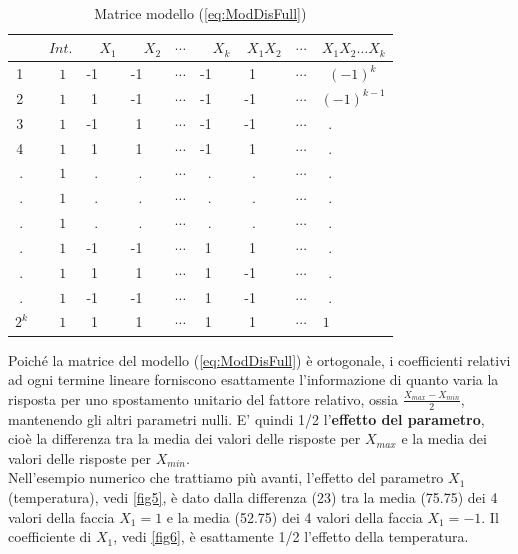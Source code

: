 \documentclass[
]{book}
\begin{document}
\begin{table}[ht]
\caption{Matrice modello (\ref{eq:ModDisFull})}
\

\label{tab:MatrModDisFull}
\centering
\begin{tabular}{rrrrrrrrr}
  \hline
       \vline & $Int.$ & $X_1$ & $X_2$ & $\cdots$ &  $X_k$ & $X_1X_2$ & $\cdots$ & $X_1X_2\dots X_k$ \\
  \hline
  1 \    \vline & $1 \ \ $ & -1 \ \ & -1 \ \ & $\cdots$ & -1 \ \ &  1 \ \ \ & $\cdots$ & $(-1)^k \ \ \ $\\
  2 \    \vline & $1 \ \ $ & 1  \ \ & -1 \ \ & $\cdots$ & -1 \ \ & -1 \ \ \ & $\cdots$ & $(-1)^{k-1}$\\
  3 \    \vline & $1 \ \ $ & -1 \ \ & 1  \ \ & $\cdots$ &-1  \ \ & -1 \ \ \ & $\cdots$ & . \ \ \ \ \ \ \ \\
  4 \    \vline & $1 \ \ $ & 1  \ \ & 1  \ \ & $\cdots$ &-1  \ \ &  1 \ \ \ &  $\cdots$ & . \ \ \ \ \ \ \ \\
  . \    \vline & $1 \ \ $ & .  \ \ & .  \ \ & $\cdots$ & .  \ \ &  . \ \ \ &  $\cdots$ & . \ \ \ \ \ \ \ \\
  . \    \vline & $1 \ \ $ & .  \ \ & .  \ \ & $\cdots$ & .  \ \ &  . \ \ \ &  $\cdots$ & . \ \ \ \ \ \ \ \\
  . \    \vline & $1 \ \ $ & .  \ \ & .  \ \ & $\cdots$ & .  \ \ &  . \ \ \ &  $\cdots$ & . \ \ \ \ \ \ \ \\
  . \    \vline & $1 \ \ $ & -1 \ \ & -1 \ \ & $\cdots$ & 1  \ \ &  1 \ \ \ &  $\cdots$ & . \ \ \ \ \ \ \ \\
  . \    \vline & $1 \ \ $ & 1  \ \ & 1  \ \ & $\cdots$ & 1  \ \ & -1 \ \ \ &  $\cdots$ & . \ \ \ \ \ \ \ \\
  . \    \vline & $1 \ \ $ & -1 \ \ & -1 \ \ & $\cdots$ &  1 \ \ & -1 \ \ \ &  $\cdots$ & . \ \ \ \ \ \ \ \\
 $2^k$\  \vline & $1 \ \ $ & 1  \ \ & 1  \ \ & $\cdots$ & 1  \ \ &  1 \ \ \ &  $\cdots$ & $1$\ \ \ \ \ \ \ \ \\
   \hline

\end{tabular}
\end{table}

Poiché la matrice del modello (\ref{eq:ModDisFull}) è ortogonale, i coefficienti relativi ad ogni termine lineare forniscono esattamente l'informazione di quanto varia la risposta per uno spostamento unitario del fattore relativo, ossia \(\frac{X_{max}-X_{min}}{2}\), mantenendo gli altri parametri nulli. E' quindi 1/2 l'\textbf{effetto del parametro}, cioè la differenza tra la media dei valori delle risposte per \(X_{max}\) e la media dei valori delle risposte per \(X_{min}\).\\
Nell'esempio numerico che trattiamo più avanti, l'effetto del parametro \(X_1\) (temperatura), vedi \autoref{fig5}, è dato dalla differenza (23) tra la media (75.75) dei 4 valori della faccia \(X_1=1\) e la media (52.75) dei 4 valori della faccia \(X_1=-1\). Il coefficiente di \(X_1\), vedi \autoref{fig6}, è esattamente 1/2 l'effetto della temperatura.
\end{document}
